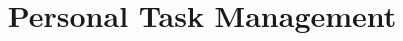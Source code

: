 \documentclass[twoside,final]{hcmut-report}
\title{Personal Task Management}
\begin{document}
\coverpage
\tableofcontents
\clearpage






\end{document}
